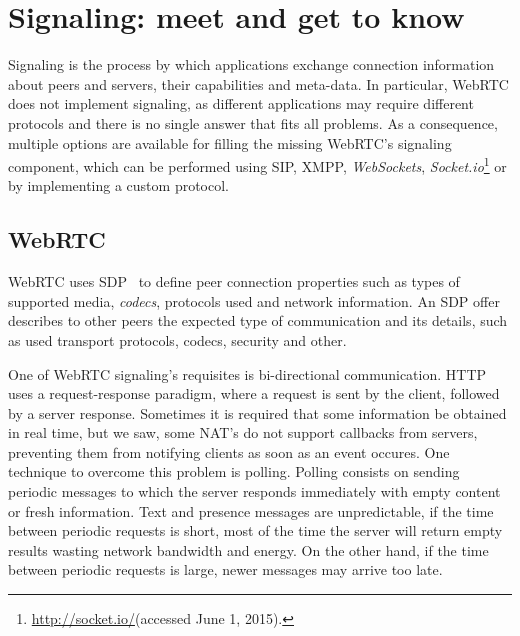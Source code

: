 \section{Signaling: meet and get to know}
\label{signaling}


  Signaling is the process by which applications exchange connection information about peers and servers, their capabilities and meta-data.
  In particular, \ac{WebRTC} does not implement signaling, as different applications may require different protocols and there is no single answer that fits all problems.
  As a consequence, multiple options are available for filling the missing \ac{WebRTC}'s signaling component, which can be performed using \ac{SIP}, \ac{XMPP}, \emph{WebSockets}, \emph{Socket.io}\footnote{\url{http://socket.io/}(accessed June 1, 2015).} or by implementing a custom protocol.

  \subsection{WebRTC}

  \ac{WebRTC} uses \ac{SDP}~\cite{rfc4566} to define peer connection properties such as types of supported media, \emph{codecs}, protocols used and network information. An \ac{SDP} offer describes to other peers the expected type of communication and its details, such as used transport protocols, codecs, security and other.

  One of \ac{WebRTC} signaling's requisites is bi-directional communication.
  \ac{HTTP} uses a request-response paradigm, where a request is sent by the client, followed by a server response.
  Sometimes it is required that some information be obtained in real time, but we saw, some \ac{NAT}'s do not support callbacks from servers, preventing them from notifying clients as soon as an event occures.
One technique to overcome this problem is polling. Polling consists on sending periodic messages to which the server responds immediately with empty content or fresh information. Text and presence messages are unpredictable, if the time between periodic requests is short, most of the time the server will return empty results wasting network bandwidth and energy. On the other hand, if the time between periodic requests is large, newer messages may arrive too late.

